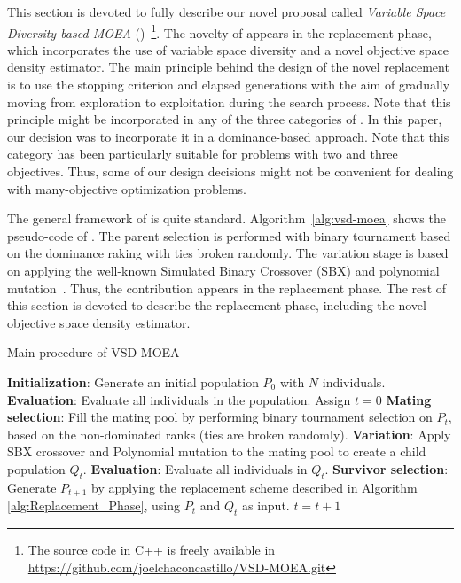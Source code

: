
This section is devoted to fully describe our novel proposal called \textit{Variable Space Diversity based MOEA} 
(\VSDMOEA{})~\footnote{The source code in C++ is freely available in \url{https://github.com/joelchaconcastillo/VSD-MOEA.git}}.
%
The novelty of \VSDMOEA{} appears in the replacement phase, which incorporates
the use of variable space diversity and a novel objective space density estimator. 
%
The main principle behind the design of the novel replacement is to use the stopping criterion and 
elapsed generations with the aim of gradually moving from exploration to exploitation during the search process.
%
Note that this principle might be incorporated in any of the three categories of \MOEAS{}.
%
In this paper, our decision was to incorporate it in a dominance-based approach.
%
Note that this category has been particularly suitable for problems with two and three objectives.
%
Thus, some of our design decisions might not be convenient for dealing with many-objective optimization problems.

The general framework of \VSDMOEA{} is quite standard.
%
Algorithm~\ref{alg:vsd-moea} shows the pseudo-code of \VSDMOEA{}.
%
The parent selection is performed with binary tournament based on the dominance raking with ties broken randomly.
%
The variation stage is based on applying the well-known Simulated Binary Crossover (SBX) 
and polynomial mutation~\cite{Joel:SBX1994, Joel:Mutation}.
%
Thus, the contribution appears in the replacement phase.
%
The rest of this section is devoted to describe the replacement phase, including the novel objective space density 
estimator.

\begin{algorithm}[t]
	\caption{Main procedure of VSD-MOEA} 
	\begin{small}
\begin{algorithmic}[1]
 	\STATE \textbf{Initialization}: Generate an initial population $P_0$ with $N$ individuals.
	\STATE \textbf{Evaluation}: Evaluate all individuals in the population.
	\STATE Assign $t=0$
	   \STATE \textbf{Mating selection}: Fill the mating pool by performing binary tournament selection on $P_t$, 
		 based on the non-dominated ranks (ties are broken randomly).
	   \STATE \textbf{Variation}: Apply SBX crossover and Polynomial mutation to the mating pool to create a child population $Q_t$.
		 \STATE \textbf{Evaluation}: Evaluate all individuals in $Q_t$.
	   \STATE \textbf{Survivor selection}: Generate $P_{t+1}$ by applying the replacement scheme 
		 described in Algorithm \ref{alg:Replacement_Phase}, using $P_t$ and $Q_t$ as input.
	   \STATE $t=t+1$
	\ENDWHILE
	\end{algorithmic}
	\end{small}
\label{alg:vsd-moea}
\end{algorithm}


